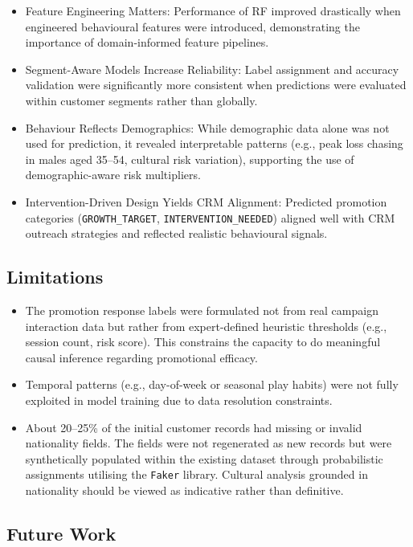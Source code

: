 \documentclass[12pt,a4paper]{report}
\begin{document}
\begin{itemize}
    \item Feature Engineering Matters: Performance of RF improved drastically when engineered behavioural features were introduced, demonstrating the importance of domain-informed feature pipelines.
    \item Segment-Aware Models Increase Reliability: Label assignment and accuracy validation were significantly more consistent when predictions were evaluated within customer segments rather than globally.
    \item Behaviour Reflects Demographics: While demographic data alone was not used for prediction, it revealed interpretable patterns (e.g., peak loss chasing in males aged 35–54, cultural risk variation), supporting the use of demographic-aware risk multipliers.
    \item Intervention-Driven Design Yields CRM Alignment: Predicted promotion categories (\texttt{GROWTH\_TARGET}, \texttt{INTERVENTION\_NEEDED}) aligned well with CRM outreach strategies and reflected realistic behavioural signals.
\end{itemize}

\subsection*{Limitations}

\begin{itemize}
    \item The promotion response labels were formulated not from real campaign interaction data but rather from expert-defined heuristic thresholds (e.g., session count, risk score).  This constrains the capacity to do meaningful causal 	inference regarding promotional efficacy.
    \item Temporal patterns (e.g., day-of-week or seasonal play habits) were not fully exploited in model training due to data resolution constraints.
    \item About 20–25\% of the initial customer records had missing or invalid nationality fields.  The fields were not regenerated as new records but were synthetically populated within the existing dataset through probabilistic assignments utilising the \texttt{Faker} library.  Cultural analysis grounded in nationality should be viewed as indicative rather than definitive.

\end{itemize}

\subsection*{Future Work}
\end{document}
